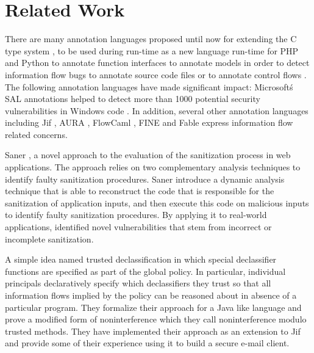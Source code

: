 \chapter{Related Work}

There are many annotation languages proposed until now for
extending the C type system \cite{ref_54_condit:dependent}, \cite{ref_53_evans:static,ref_51_microsoft:sal,ref_55_sun:lock,ref_56_torvalds:sparse} to be
used during run-time as a new language run-time for PHP and
Python \cite{ref_57_alex:improving} to annotate function interfaces \cite{ref_53_evans:static,ref_51_microsoft:sal,ref_56_torvalds:sparse} to
annotate models in order to detect information flow bugs \cite{ref_27_iflow:kuzman}
to annotate source code files \cite{ref_59_rosenblum:towards,ref_60_rosenblum:practical,ref_61_lintan:acomment} or to annotate
control flows \cite{ref_53_evans:static,ref_52_splint:flow,ref_51_microsoft:sal}. The following annotation languages have made significant impact: Microsoft\'s SAL annotations \cite{ref_51_microsoft:sal} helped to detect more than 1000 potential security vulnerabilities in Windows
code \cite{ref_50_ball:research}. In addition, several other annotation languages including  Jif \cite{ref_48_chong:jif}, AURA \cite{ref_46_jia:aura}, FlowCaml \cite{ref_32_simonet:report}, FINE \cite{ref_45_nikhil:fine} and Fable \cite{ref_47_swamy:fable} express information flow related concerns.

Saner \cite{ref_61_lintan:acomment}, a novel approach to the evaluation of the sanitization process in web applications. The approach relies on two complementary analysis techniques to identify faulty sanitization procedures. Saner \cite{ref_61_lintan:acomment} introduce a dynamic analysis technique that is
able to reconstruct the code that is responsible for
the sanitization of application inputs, and then execute this code on malicious inputs to identify faulty
sanitization procedures. By applying
it to real-world applications, identified novel vulnerabilities that stem from incorrect or incomplete sanitization.

A simple idea named trusted declassification \cite{ref_2_hicks2006trusted} in which special declassifier functions are specified as part of the global policy. In particular, individual principals declaratively specify which declassifiers they trust so that all information flows implied by the policy can be reasoned about in absence of a particular program. They formalize their approach for a Java like language and prove a modified form of noninterference which they call noninterference modulo trusted methods. They have implemented their approach as an extension to Jif and provide some of their experience using it to build a secure e-mail client.

